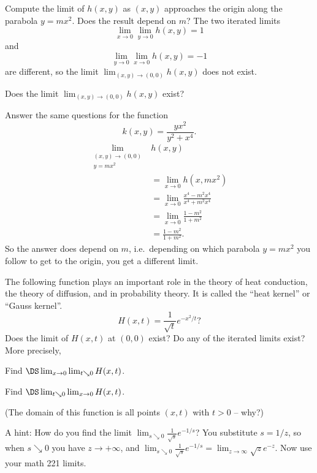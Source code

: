 \begin{multicols}{2}
\subprob Compute the limit of $h(x, y)$ as $(x,y)$ approaches the
origin along the parabola $y=mx^2$.  Does the result depend on $m$?
\answer
The two iterated limits
\[
\lim_{x\to0}\lim_{y\to0} h(x, y) = 1
\]
and
\[
\lim_{y\to0}\lim_{x\to0} h(x, y) = -1
\]
are different, so the limit $\lim_{(x,y)\to(0,0)}h(x, y)$ does not exist.
\endanswer


\subprob Does the limit $\lim_{(x,y)\to(0,0)}h(x, y)$ exist? 

\subprob Answer the same questions for the function
\[
k(x, y) = \frac{yx^2}{y^2+x^4}.
\]
\answer
\begin{align*}
  \lim_{\substack{(x, y)\to(0,0)\\y=mx^2}}& h(x,y)\\
  &=\lim_{x\to 0} h(x, mx^2)\\
  &=\lim_{x\to0} \frac{x^4 - m^2x^4} {x^4+m^2x^4}\\
  &=\lim_{x\to0} \frac{1 - m^2} {1+m^2}\\
  &=\frac{1 - m^2} {1+m^2}.
\end{align*}
So the answer does depend on $m$, i.e.\ depending
on which parabola $y=mx^2$ you follow to get to the origin,
you get a different limit.
\endanswer


\problem The following function plays an important role in the theory
of heat conduction, the theory of diffusion, and in probability
theory.  It is called the ``heat kernel'' or ``Gauss kernel''.
\[
H(x, t) = \frac{1}{\sqrt{t}} e^{-{x^2}/{t}}?
\]
Does the limit of $H(x, t)$ at $(0,0)$ exist?  Do any of the iterated
limits exist? More precisely,

\subprob Find $\DS \lim_{x\to 0}\lim_{t\searrow 0} H(x, t)$.

\subprob Find $\DS \lim_{t\searrow 0}\lim_{x\to 0} H(x, t)$.

(The domain of this function is all points $(x,t)$ with $t>0$ -- why?)

A hint:  How do you find the limit $\lim_{s\searrow
0}\frac{1}{\surd s}e^{-1/s}$?  You substitute $s=1/z$, so when $s\searrow 0$
you have $z\to+\infty$, and $\lim_{s\searrow 0}\frac1{\surd s} e^{-1/s} =
\lim_{z\to\infty} \sqrt z e^{-z}$.  Now use your math 221 limits.

\end{multicols}




